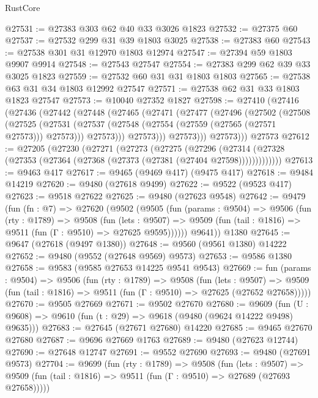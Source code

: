 \begin{lexlean}{RustCore}
\begin{coremodule}
@27531 := @27383 @303 @62 @40 @33 @3026 @1823
@27532 := @27375 @60
@27537 := @27532 @299 @31 @39 @1803 @3025
@27538 := @27383 @60
@27543 := @27538 @301 @31 @12970 @1803 @12974
@27547 := @27394 @59 @1803 @9907 @9914
@27548 := @27543 @27547
@27554 := @27383 @299 @62 @39 @33 @3025 @1823
@27559 := @27532 @60 @31 @31 @1803 @1803
@27565 := @27538 @63 @31 @34 @1803 @12992 @27547
@27571 := @27538 @62 @31 @33 @1803 @1823 @27547
@27573 := @10040 @27352 @1827
@27598 := @27410
    (@27416
      (@27436
        (@27442
          (@27448
            (@27465
              (@27471
                (@27477
                  (@27496
                    (@27502
                      (@27508
                        (@27525
                          (@27531
                            (@27537 (@27548 (@27554 (@27559 (@27565 (@27571 @27573))) @27573)))
                            @27573)))
                      @27573)))
                @27573)))
          @27573)))
    @27573
@27612 := @27205
    (@27230
      (@27271
        (@27273
          (@27275
            (@27296
              (@27314 (@27328 (@27353 (@27364 (@27368 (@27373 (@27381 (@27404 @27598)))))))))))))
@27613 := @9463 @417
@27617 := @9465 (@9469 @417) (@9475 @417)
@27618 := @9484 @14219
@27620 := @9480 (@27618 @9499)
@27622 := @9522 (@9523 @417)
@27623 := @9518 @27622
@27625 := @9480 (@27623 @9548)
@27642 := @9479
    (fun (fn : @7) =>
    @27620
      (@9502
        (@9505
          (fun (params : @9504) =>
          @9506
            (fun (rty : @1789) =>
            @9508
              (fun (lets : @9507) =>
              @9509 (fun (tail : @1816) => @9511 (fun (Γ : @9510) => @27625 @9595))))))
        @9641))
    @1380
@27645 := @9647 (@27618 (@9497 @1380))
@27648 := @9560 (@9561 @1380) @14222
@27652 := @9480 (@9552 (@27648 @9569) @9573)
@27653 := @9586 @1380
@27658 := @9583 (@9585 @27653 @14225 @9541 @9543)
@27669 := fun (params : @9504) =>
  @9506
    (fun (rty : @1789) =>
    @9508
      (fun (lets : @9507) =>
      @9509 (fun (tail : @1816) => @9511 (fun (Γ : @9510) => @27625 (@27652 @27658)))))
@27670 := @9505 @27669
@27671 := @9502 @27670
@27680 := @9609
    (fun (U : @9608) => @9610 (fun (t : @29) => @9618 (@9480 (@9624 @14222 @9498) @9635)))
@27683 := @27645 (@27671 @27680) @14220
@27685 := @9465 @27670 @27680
@27687 := @9696 @27669 @1763
@27689 := @9480 (@27623 @12744)
@27690 := @27648 @12747
@27691 := @9552 @27690
@27693 := @9480 (@27691 @9573)
@27704 := @9699
    (fun (rty : @1789) =>
    @9508
      (fun (lets : @9507) =>
      @9509 (fun (tail : @1816) => @9511 (fun (Γ : @9510) => @27689 (@27693 @27658)))))

\end{coremodule}
\end{lexlean}
